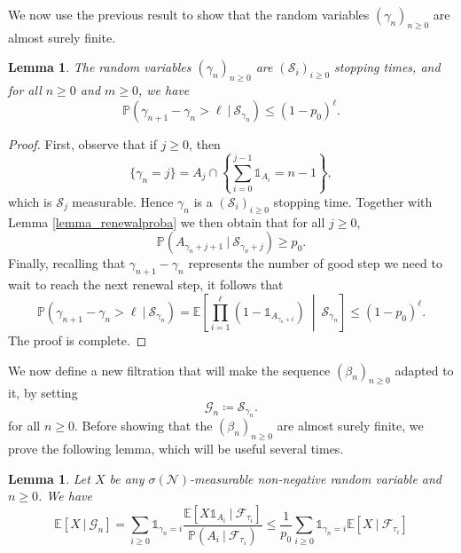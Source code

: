\documentclass[a4paper, 11pt]{article}
\theoremstyle{plain}
\newtheorem{Lemma}[Theorem]{Lemma}
\theoremstyle{definition}
\newcommand{\E}{\mathbb{E}}
\renewcommand{\P}{\mathbb{P}}
\numberwithin{equation}{section}
\begin{document}
We now use the previous result to show that the random variables $(\gamma_n)_{n\geq 0}$ are almost surely finite.


\begin{Lemma}
    \label{lemma_eta_stoppingtimes}
    The random variables $(\gamma_n)_{n\geq 0}$ are $(\mathcal S_i)_{i\geq 0}$ stopping times, and for all $n\geq 0$ and $m\geq 0$, we have
        \[\P(\gamma_{n+1}-\gamma_n>\ell~|~\mathcal S_{\gamma_n})\leq(1-p_0)^\ell.\]
\end{Lemma}

\begin{proof}
    First, observe that if $j\geq 0$, then 
        \[\{\gamma_n=j\}=A_j\cap\left\lbrace\sum_{i=0}^{j-1}\mathds 1_{A_i}=n-1\right\rbrace,\]
    which is $\mathcal S_j$ measurable. Hence $\gamma_n$ is a $(\mathcal S_i)_{i\geq 0}$ stopping time. Together with Lemma \ref{lemma_renewalproba} we then obtain that for all $j\geq0$, 
        \[\P(A_{\gamma_n+j+1}~|~\mathcal S_{\gamma_n+j})\geq p_0.\]
    Finally, recalling that $\gamma_{n+1}-\gamma_n$ represents the number of good step we need to wait to reach the next renewal step, it follows that
        \[\P(\gamma_{n+1}-\gamma_n>\ell~|~\mathcal S_{\gamma_n})=\E\left[\prod_{i=1}^\ell (1-\mathds 1_{A_{\gamma_n+i}})~\middle|~\mathcal S_{\gamma_n}\right]\leq(1-p_0)^\ell.\]
    The proof is complete.
\end{proof}


We now define a new filtration that will make the sequence $(\beta_n)_{n\geq 0}$ adapted to it, by setting
    \[\mathcal G_n\coloneqq\mathcal S_{\gamma_n}.\]
for all $n\geq0$. Before showing that the $(\beta_n)_{n\geq 0}$ are almost surely finite, we prove the following lemma, which will be useful several times.


\begin{Lemma}
    \label{lemma_EGn}
    Let $X$ be any $\sigma(\mathcal N)$-measurable non-negative random variable and $n\geq 0$. We have
        \[\E[X~|~\mathcal G_n]=\sum_{i\geq 0}\mathds 1_{\gamma_n=i}\frac{\E[X\mathds 1_{A_i}~|~\mathcal F_{\tau_i}]}{\P(A_i~|~\mathcal F_{\tau_i})}\leq\frac{1}{p_0}\sum_{i\geq 0}\mathds 1_{\gamma_n=i}\E[X~|~\mathcal F_{\tau_i}]\]
\end{Lemma}
\end{document}
